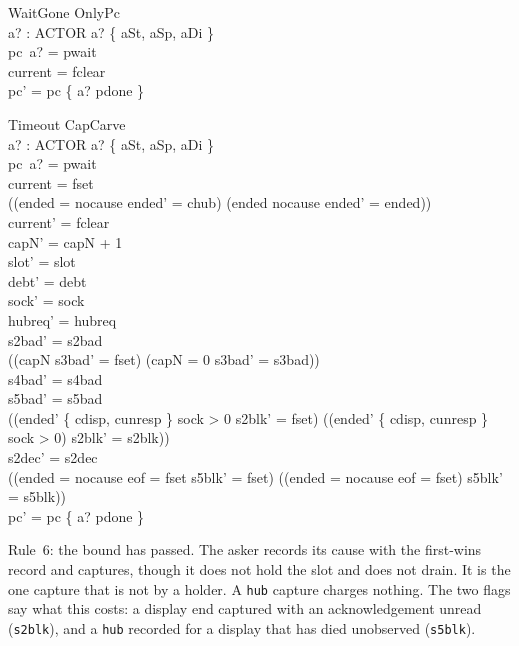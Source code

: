 \documentclass[a4paper,10pt,fleqn]{article}
\begin{document}
\begin{schema}{WaitGone}
  OnlyPc \\
  a? : ACTOR
\where
  a? \in \{ aSt, aSp, aDi \} \\
  pc~a? = pwait \\
  current = fclear \\
  pc' = pc \oplus \{ a? \mapsto pdone \}
\end{schema}

\begin{schema}{Timeout}
  CapCarve \\
  a? : ACTOR
\where
  a? \in \{ aSt, aSp, aDi \} \\
  pc~a? = pwait \\
  current = fset \\
  ((ended = nocause \land ended' = chub) \lor (ended \neq nocause \land ended' = ended)) \\
  current' = fclear \\
  capN' = capN + 1 \\
  slot' = slot \\
  debt' = debt \\
  sock' = sock \\
  hubreq' = hubreq \\
  s2bad' = s2bad \\
  ((capN  \land s3bad' = fset) \lor (capN = 0 \land s3bad' = s3bad)) \\
  s4bad' = s4bad \\
  s5bad' = s5bad \\
  ((ended' \in \{ cdisp, cunresp \} \land sock > 0 \land s2blk' = fset) \lor
    (\lnot (ended' \in \{ cdisp, cunresp \} \land sock > 0) \land s2blk' = s2blk)) \\
  s2dec' = s2dec \\
  ((ended = nocause \land eof = fset \land s5blk' = fset) \lor
    (\lnot (ended = nocause \land eof = fset) \land s5blk' = s5blk)) \\
  pc' = pc \oplus \{ a? \mapsto pdone \}
\end{schema}

Rule~6: the bound has passed.  The asker records its cause with the first-wins
record and captures, though it does not hold the slot and does not drain.  It is
the one capture that is not by a holder.  A \texttt{hub} capture charges nothing.
The two flags say what this costs: a display end captured with an
acknowledgement unread (\texttt{s2blk}), and a \texttt{hub} recorded for a
display that has died unobserved (\texttt{s5blk}).
\end{document}

